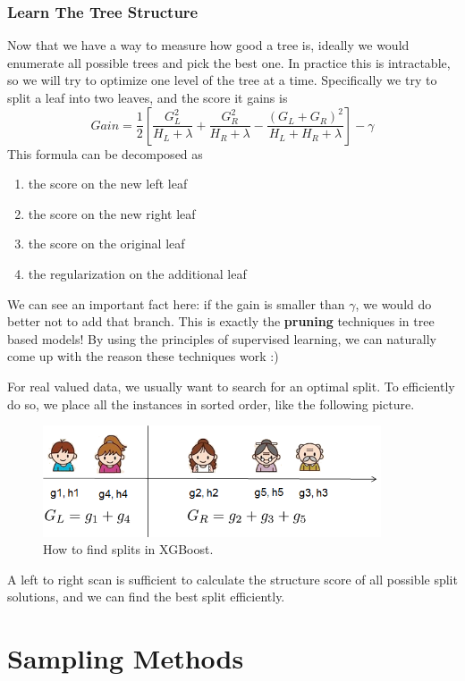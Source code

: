 \documentclass[a3paper, 12pt]{book} %
\begin{document}
\subsection{Learn The Tree Structure}
Now that we have a way to measure how good a tree is, ideally we would enumerate all possible trees and pick the best one. In practice this is intractable, so we will try to optimize one level of the tree at a time. Specifically we try to split a leaf into two leaves, and the score it gains is
\begin{equation}
Gain = \frac{1}{2} \left[\frac{G_L^2}{H_L+\lambda}+\frac{G_R^2}{H_R+\lambda}-\frac{(G_L+G_R)^2}{H_L+H_R+\lambda}\right] - \gamma
\end{equation}
This formula can be decomposed as 
\begin{enumerate}
	\item the score on the new left leaf
	\item the score on the new right leaf
	\item the score on the original leaf
	\item the regularization on the additional leaf
\end{enumerate}
We can see an important fact here: if the gain is smaller than $\gamma$, we would do better not to add that branch. This is exactly the \textbf{pruning} techniques in tree based models! By using the principles of supervised learning, we can naturally come up with the reason these techniques work :)

For real valued data, we usually want to search for an optimal split. To efficiently do so, we place all the instances in sorted order, like the following picture.
\begin{figure}[htpb]
	\centering
	\includegraphics[width=10cm]{figures/split_find.png}
	\caption{How to find splits in XGBoost.}
	\label{fig:boat1}
\end{figure}
A left to right scan is sufficient to calculate the structure score of all possible split solutions, and we can find the best split efficiently.


\chapter{Sampling Methods}
\end{document}
